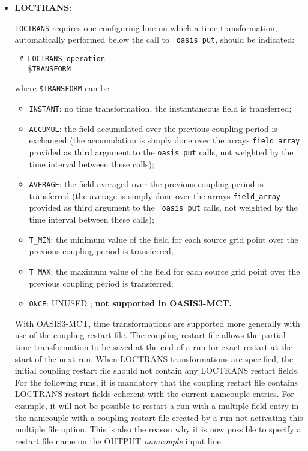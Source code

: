 \begin{itemize}

\item {\bf LOCTRANS}:

  {\tt LOCTRANS} requires one configuring line on which a time
  transformation, automatically performed below the call to {\tt
    oasis\_put}, should be indicated:

  \begin{verbatim}
 # LOCTRANS operation
   $TRANSFORM
\end{verbatim}
  \vspace{-0.2cm} where {\tt \$TRANSFORM} can be
  \begin{itemize}
  \item {\tt INSTANT}: no time transformation, the instantaneous field
    is transferred;
  \item {\tt ACCUMUL}: the field accumulated over the previous
    coupling period is exchanged (the accumulation is simply done over
    the arrays {\tt field\_array} provided as third argument to the
    {\tt oasis\_put} calls, not weighted by the time interval between
    these calls);
  \item {\tt AVERAGE}: the field averaged over the previous coupling
    period is transferred (the average is simply done over the arrays
    {\tt field\_array} provided as third argument to the {\tt
      oasis\_put} calls, not weighted by the time interval between
    these calls);
  \item {\tt T\_MIN}: the minimum value of the field for each source
    grid point over the previous coupling period is transferred;
  \item {\tt T\_MAX}: the maximum value of the field for each source
    grid point over the previous coupling period is transferred;
  \item {\tt ONCE}: UNUSED ; {\bf not supported in OASIS3-MCT.}
  \end{itemize}

  With OASIS3-MCT, time transformations are supported more generally
  with use of the coupling restart file.  The coupling restart file
  allows the partial time transformation to be saved at the end of a
  run for exact restart at the start of the next run. When LOCTRANS 
  transformations are specified, the initial coupling restart file
  should not contain any LOCTRANS restart fields. For the following
  runs, it is mandatory that the coupling restart file contains
  LOCTRANS restart fields coherent with the current namcouple
  entries. For example, it will not be possible to restart a run with
  a multiple field entry in the namcouple with a coupling restart file 
  created by a run not activating this multiple file option. This is
  also the reason why it is now possible to specify a restart file name
  on the OUTPUT {\it namcouple} input line.

\end{itemize}

